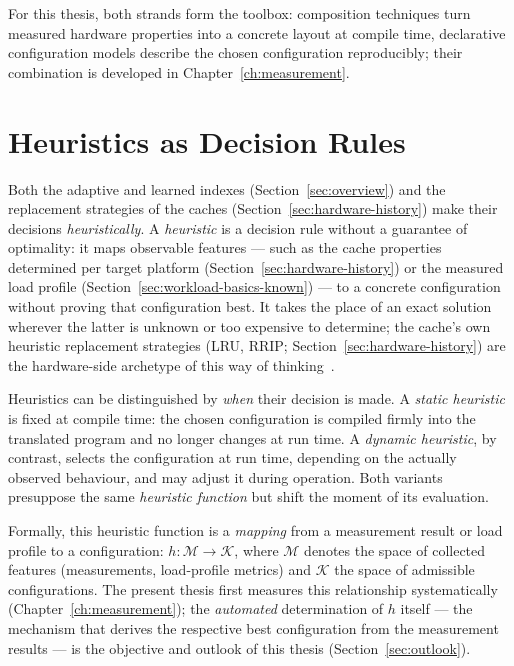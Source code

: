 \begin{nurkurz}
For this thesis, both strands form the toolbox: composition techniques turn measured hardware properties into
a concrete layout at compile time, declarative configuration models describe the chosen configuration
reproducibly; their combination is developed in Chapter~\ref{ch:measurement}.
\end{nurkurz}

\section{Heuristics as Decision Rules}\label{sec:heuristics-basics}
Both the adaptive and learned indexes (Section~\ref{sec:overview}) and the replacement strategies of
the caches (Section~\ref{sec:hardware-history}) make their decisions \emph{heuristically}. A
\emph{heuristic} is a decision rule without a guarantee of optimality: it maps observable features ---
such as the cache properties determined per target platform (Section~\ref{sec:hardware-history}) or
the measured load profile (Section~\ref{sec:workload-basics-known}) --- to a concrete configuration
without proving that configuration best. It takes the place of an exact solution wherever the latter
is unknown or too expensive to determine; the cache's own heuristic replacement strategies (LRU,
RRIP\@; Section~\ref{sec:hardware-history}) are the hardware-side archetype of this way of
thinking~\cite{jaleel2010rrip}.

Heuristics can be distinguished by \emph{when} their decision is made. A \emph{static heuristic} is
fixed at compile time: the chosen configuration is compiled firmly into the translated program and no
longer changes at run time. A \emph{dynamic heuristic}, by contrast, selects the configuration at run
time, depending on the actually observed behaviour, and may adjust it during operation. Both variants
presuppose the same \emph{heuristic function} but shift the moment of its evaluation.

\begin{nurlang}
Formally, this heuristic function is a \emph{mapping} from a measurement result or load profile to a
configuration: $h: \mathcal{M} \rightarrow \mathcal{K}$, where $\mathcal{M}$ denotes the space of
collected features (measurements, load-profile metrics) and $\mathcal{K}$ the space of admissible
configurations. The present thesis first measures this relationship systematically
(Chapter~\ref{ch:measurement}); the \emph{automated} determination of $h$ itself --- the mechanism
that derives the respective best configuration from the measurement results --- is the objective and
outlook of this thesis (Section~\ref{sec:outlook}).
\end{nurlang}

